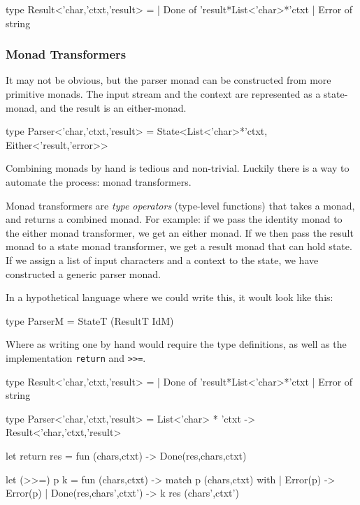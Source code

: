   \begin{code}[language=Caml]
  type Result<'char,'ctxt,'result> = 
    | Done  of 'result*List<'char>*'ctxt
    | Error of string
  \end{code}

  \subsubsection*{Monad Transformers}
  It may not be obvious, but the parser monad can be constructed from more primitive monads.
  The input stream and the context are represented as a state-monad, and the result is an either-monad.

  \begin{code}[language=Caml]
  type Parser<'char,'ctxt,'result> =
    State<List<'char>*'ctxt,
          Either<'result,'error>>
  \end{code}

  Combining monads by hand is tedious and non-trivial.
  Luckily there is a way to automate the process: monad transformers.\cite[Chapter~18]{Haskell}

  Monad transformers are \textit{type operators} (type-level functions) that takes a monad, and returns a combined monad.
  For example:
  if we pass the identity monad to the either monad transformer, we get an either monad.
  If we then pass the result monad to a state monad transformer, we get a result monad that can hold state.
  If we assign a list of input characters and a context to the state, we have constructed a generic parser monad.

  In a hypothetical language where we could write this, it woult look like this:
  
  \begin{code}[language=Caml]
    type ParserM = StateT (ResultT IdM)
  \end{code}
  
 Where as writing one by hand would require the type definitions, as well as the implementation \verb|return| and \verb|>>=|.

  \begin{code}[language=Caml]
  type Result<'char,'ctxt,'result> = 
    | Done  of 'result*List<'char>*'ctxt
    | Error of string
  \end{code}
  \begin{code}[language=Caml]
  type Parser<'char,'ctxt,'result> =
    List<'char> * 'ctxt
      -> Result<'char,'ctxt,'result>
  \end{code}
  \begin{code}[language=Caml]
  let return res =
    fun (chars,ctxt) ->
      Done(res,chars,ctxt)
  \end{code}
  \begin{code}[language=Caml]
  let (>>=) p k =
    fun (chars,ctxt) ->
      match p (chars,ctxt) with
      | Error(p) ->
          Error(p)
      | Done(res,chars',ctxt') ->
          k res (chars',ctxt')
  \end{code}

